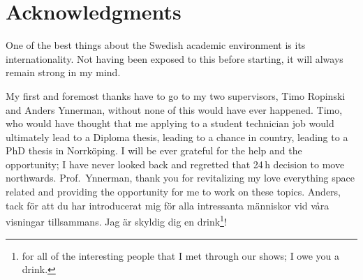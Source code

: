 \chapter*{Acknowledgments}
\novocalize

One of the best things about the Swedish academic environment is its internationality. Not having been exposed to this before starting, it will always remain strong in my mind.

My first and foremost thanks have to go to my two supervisors, Timo Ropinski and Anders Ynnerman, without none of this would have ever happened. Timo, who would have thought that me applying to a student technician job would ultimately lead to a Diploma thesis, leading to a chance in country, leading to a PhD thesis in Norrk\"oping. I will be ever grateful for the help and the opportunity; I have never looked back and regretted that 24\,h decision to move northwards. Prof.~Ynnerman, thank you for revitalizing my love everything space related and providing the opportunity for me to work on these topics. Anders, tack f\"or att du har introducerat mig f\"or alla intressanta m\"anniskor vid v\aa ra visningar tillsammans. Jag \"ar skyldig dig en drink\footnote{for all of the interesting people that I met through our shows; I owe you a drink.}!

